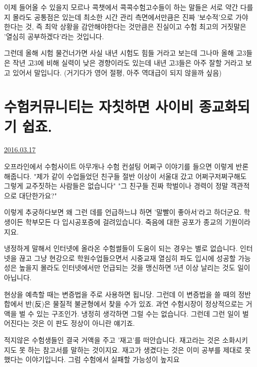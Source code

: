이제 들어올 수 있을지 모르나 콕챗에서 콕콕수험고수들이 하는 말들은 서로 약간 다를지 몰라도 공통점은 있는데
최소한 시간 관리 측면에서만큼은 진짜 '보수적'으로 가야한다는 것, 즉 최악 상황을 감안해야한다는 것만큼은 진실이고
수험 최고의 거짓말은 '열심히 공부하겠다'라는 것입니다.
\vspace{5mm}

그런데 올해 시험 물건너가면 사실 내년 시험도 힘들 거라고 보는데
그나마 올해 고3들은 작년 고3에 비해 실력이 낮은 경향이라도 있는데 내년 고3들은 아주 잘할 거라고 보고 있어서 말입니다.
(거기다가 영어 절평, 아주 역대급이 되지 않을까 싶음)
\vspace{5mm}








\section{수험커뮤니티는 자칫하면 사이비 종교화되기 쉽죠.}
\href{https://www.kockoc.com/Apoc/680137}{2016.03.17}

\vspace{5mm}

오프라인에서 수험사이트 아무개나 수험 컨설팅 어쩌구 이야기를 들으면 이렇게 반론해줍니다.
"제가 같이 수업들었던 친구들 절반 이상이 서울대 갔고 어쩌구저쩌구해도 그렇게 교주짓하는 사람들은 없습니다"
"그 친구들 진짜 학벌이나 경력이 정말 객관적으로 대단한가요?"
\vspace{5mm}

이렇게 추궁하다보면 왜 그런 데를 언급하느냐 하면 '말빨이 좋아서'라고 하더군요.
학생이든 학부모든 다 입시공포증에 걸려있습니다. 죽음에 대한 공포가 종교의 기원이라지요.
\vspace{5mm}

냉정하게 말해서 인터넷에 올라온 수험썰들이 도움이 되는 경우는 별로 없습니다.
인터넷을 끊고 그냥 현강으로 학원수업들으면서 시중교재 열심히 파도 입시에 성공할 가능성은 높을지 몰라도
인터넷에서만 언급되는 것을 맹신하면 5년 이상 날리는 것도 일이 아닙니다.
\vspace{5mm}

현상을 예측할 때는 변증법을 주로 사용하면 됩니당.
그런데 이 변증법을 쓸 때의 정반합에서 반(反)은 물질적 불균형에서 찾을 수가 있죠.
과연 수험시장이 정상적으로는 거액을 벌 수 있는 구조인가.
냉정히 생각하면 그럴 수는 없습니다. 그런데 그런 일이 벌어진다는 것은 이 판도 정상이 아니란 얘기죠.
\vspace{5mm}

적지않은 수험생들인 결국 거액을 주고 '재고'를 떠안습니다.
재고라는 것은 소화시키지도 못 하는 참고서를 말하는 것이지요.
재고가 생겼다는 것은 이미 공부를 제대로 못 했다는 이야기입니다. 그럼 수험에서 실패할 가능성이 높지요
\vspace{5mm}

